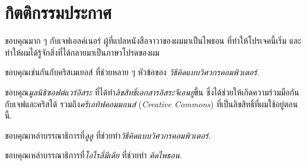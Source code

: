 \section*{กิตติกรรมประกาศ}


ขอบคุณมาก ๆ กับเจฟเอลค์เนอร์ ผู้ที่แปลหนังสือจาวาของผมมาเป็นไพธอน
ที่ทำให้โปรเจคนี้เริ่ม
และทำให้ผมได้รู้จักสิ่งที่ได้กลายมาเป็นภาษาโปรดของผม


ขอบคุณเช่นกันกับคริสเมเยอส์
ที่ช่วยหลาย ๆ หัวข้อของ
\textit{วิธีคิดแบบวิศวกรคอมพิวเตอร์}.


ขอบคุณ\textit{มูลนิธิซอฟต์แวร์อิสระ} 
ที่ได้ทำ\textit{ลิขสิทธิ์เอกสารอิสระจีเอนยู}ขึ้น
ซึ่งได้ช่วยให้เกิดความร่วมมือกันกับเจฟและคริสได้
รวมถึง\textit{ครีเอทิฟคอมมอนส์} (\textit{Creative Commons}) ที่เป็นลิขสิทธิ์ที่ผมใช้อยู่ตอนนี้.


ขอบคุณเหล่าบรรณาธิการที่\textit{ลูลู}
ที่ช่วยทำ\textit{วิธีคิดแบบวิศวกรคอมพิวเตอร์}.


ขอบคุณเหล่าบรรณาธิการที่\textit{โอไรลี่มีเดีย}
ที่ช่วยทำ \textit{คิดไพธอน}.



